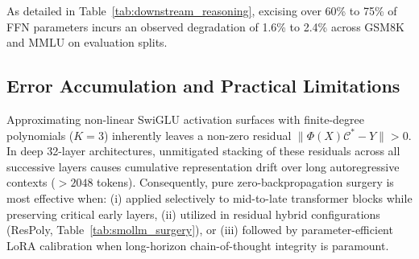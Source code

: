 \documentclass[journal,lettersize]{IEEEtran}
\begin{document}
\begin{table}[h]
\centering
\caption{Downstream Reasoning \& Benchmark Retention (Sampled Splits)}
\label{tab:downstream_reasoning}
\setlength{\tabcolsep}{2.5pt}
\end{table}

As detailed in Table~\ref{tab:downstream_reasoning}, excising over 60\% to 75\% of FFN parameters incurs an observed degradation of 1.6\% to 2.4\% across GSM8K and MMLU on evaluation splits. 

\subsection{Error Accumulation and Practical Limitations}
Approximating non-linear SwiGLU activation surfaces with finite-degree polynomials ($K=3$) inherently leaves a non-zero residual $\|\Phi(X)\mathcal{C}^* - Y\| > 0$. In deep 32-layer architectures, unmitigated stacking of these residuals across all successive layers causes cumulative representation drift over long autoregressive contexts ($>2048$ tokens). Consequently, pure zero-backpropagation surgery is most effective when: (i) applied selectively to mid-to-late transformer blocks while preserving critical early layers, (ii) utilized in residual hybrid configurations (ResPoly, Table~\ref{tab:smollm_surgery}), or (iii) followed by parameter-efficient LoRA calibration when long-horizon chain-of-thought integrity is paramount.
\end{document}
